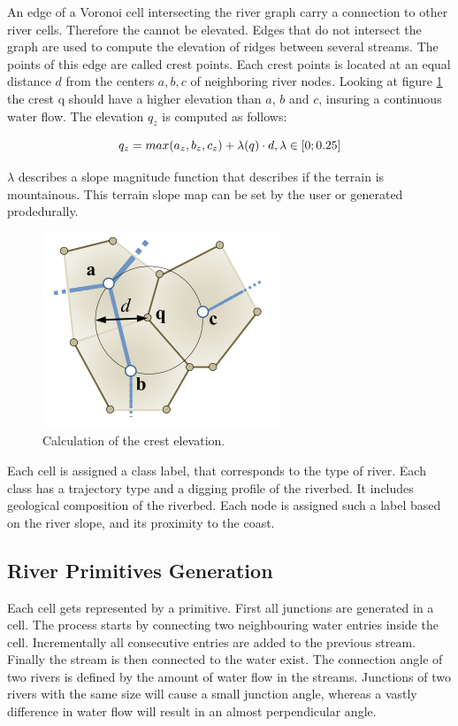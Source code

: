 An edge of a Voronoi cell intersecting the river graph carry a connection to other river cells. Therefore the cannot be elevated. Edges that do not intersect the graph are used to compute the elevation of ridges between several streams. The points of this edge are called crest points. Each crest points is located at an equal distance $d$ from the centers $a, b, c$ of neighboring river nodes. Looking at figure \ref{fig:crest} the crest q should have a higher elevation than $a$, $b$ and $c$, insuring a continuous water flow. The elevation $q_z$ is computed as follows: 

$$q_z = max(a_z, b_z, c_z) + \lambda(q) \cdot d, \\ \lambda \in [0; 0.25]$$ 

$\lambda$ describes a slope magnitude function that describes if the terrain is mountainous. This terrain slope map can be set by the user or generated prodedurally. 
\begin{figure}[htb]
	\centering
	\includegraphics[width=\linewidth]{GGG13/crest}
	\caption{Calculation of the crest elevation.}
	\label{fig:crest}
\end{figure}

Each cell is assigned a class label, that corresponds to the type of river. Each class has a trajectory type and a digging profile of the riverbed. It includes geological composition of the riverbed. Each node is assigned such a label based on the river slope, and its proximity to the coast. 

\subsection{River Primitives Generation}
Each cell gets represented by a primitive. First all junctions are generated in a cell. The process starts by connecting two neighbouring water entries inside the cell. Incrementally all consecutive entries are added to the previous stream. Finally the stream is then connected to the water exist. The connection angle of two rivers is defined by the amount of water flow in the streams. Junctions of two rivers with the same size will cause a small junction angle, whereas a vastly difference in water flow will result in an almost perpendicular angle. 

